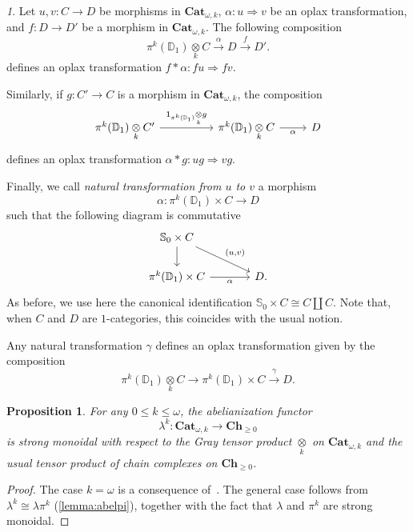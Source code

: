 \documentclass[reqno]{amsart}
\theoremstyle{plain}
\newtheorem{proposition}[subsubsection]{Proposition}
\theoremstyle{definition}
\theoremstyle{remark}
\newtheorem{paragr}[subsubsection]{} %
\newcommand{\Unit}[1]{\mathsf{1}_{#1}}%
\newcommand{\wsk}{\ast} %
\newcommand{\ctg}[1]{\mathbf{#1}}  %
\newcommand{\Cat}{\ctg{Cat}}   %
\newcommand{\opCat}[1]{\Cat_{\omega,#1}} %
\newcommand{\Ch}[1]{\ctg{Ch}_{#1}} %
\newcommand{\Chp}{\Ch{\geq 0}} %
\newcommand{\functor}[1]{\mathsf{#1}} %
\newcommand{\pifun}[2]{\functor{\pi}_{#2}^{#1}}%
\newcommand{\opifun}[1]{\pifun{#1}{}}%
\newcommand{\abel}{\functor{\lambda}} %
\newcommand{\abelk}[1]{\functor{\abel}^{#1}}%
\newcommand{\oo}{\ensuremath{\omega}}
\newcommand{\Sph}[1]{\mathbb{S}_{#1}} %
\newcommand{\Dsk}[1]{\mathbb{D}_{#1}} %
\newcommand{\gray}{\otimes}
\newcommand{\grayk}[1]{\underset{#1}{\gray}} %
\begin{document}
\begin{paragr}
Let $u,v\colon C\to D$ be morphisms in $\opCat k$, $\alpha\colon
u\Rightarrow v$ be an oplax transformation, and $f\colon D\to D'$ be a
morphism in $\opCat  k$.  The following composition
\[
 \opifun{k}(\Dsk{1}) \grayk{k} C \overset{\alpha}{\longrightarrow} D
  \overset{f}{\longrightarrow} D'.
\]
defines an oplax transformation $f\wsk\alpha\colon fu \Rightarrow fv$.

Similarly, if $g \colon C' \to C$ is a morphism in $\opCat{k}$, the composition
\[
  \begin{tikzcd}
    \opifun{k}(\Dsk{1})\grayk{k} C'
    \ar[rr,"\Unit{\opifun{k}(\Dsk{1})}\grayk{k}g"]&&
    \opifun{k}(\Dsk{1})\grayk{k} C\ar[r,"\alpha"']&
    D
  \end{tikzcd}
\]
defines an oplax transformation $\alpha \wsk g \colon ug \Rightarrow vg$.

Finally, we call \emph{natural transformation from $u$ to $v$} a morphism
\[
  \alpha \colon \opifun{k}(\Dsk{1})\times C \to D
\]
such that the following diagram is commutative
  \[
    \begin{tikzcd}[column sep=large]
      \Sph{0}\times C \ar[d] \ar[dr,"{\left(u,v\right)}"] & \\
      \opifun{k}(\Dsk{1})\times C \ar[r,"\alpha"'] & D. 
    \end{tikzcd}
  \]
  As before, we use here the canonical identification
  $\Sph{0}\times C\cong C \coprod C$. Note that, when $C$ and $D$ are
  $1$-categories, this coincides with the usual notion.

  Any  natural
  transformation $\gamma$ defines an oplax transformation given by the composition
\[
     \opifun{k}(\Dsk{1})\grayk{k}C \longrightarrow  \opifun{k}(\Dsk{1})\times C \overset{\gamma}{\longrightarrow} D.
  \]
\end{paragr}
\begin{proposition}\label{prop:abelmonoidal}
  For any $0 \leq k \leq \oo$, the abelianization functor
  \[
    \abelk{k} \colon \opCat{k} \to \Chp
  \]
  is strong monoidal with respect to the Gray tensor product $\grayk{k}$ on
  $\opCat{k}$ and the usual tensor product of chain complexes on $\Chp$.
\end{proposition}
\begin{proof}
  The case $k=\oo$ is a consequence of~\cite[Proposition A.19]{ara_maltsiniotis:joint}. The
  general case follows from  $\abelk{k}\cong
  \abel\opifun{k}$ (\cref{lemma:abelpi}), together with the fact
  that $\abel$ and $\opifun{k}$ are strong monoidal.
\end{proof}
\end{document}
